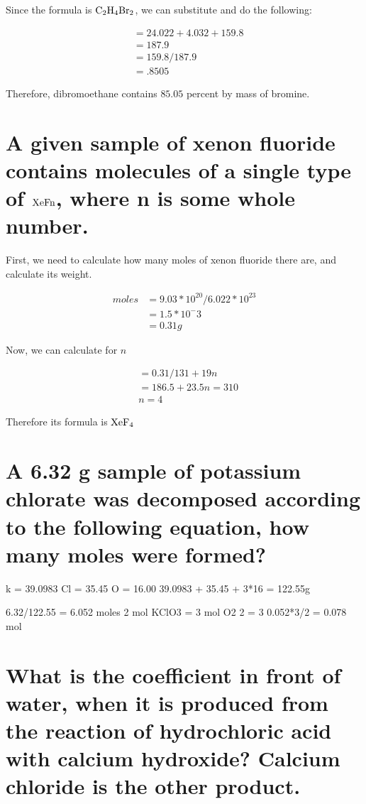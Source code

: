 \documentclass{scrartcl}
\begin{document}
Since the formula is  \(\ce{C2H4Br2}\), we can substitute and do the following:

\begin{align*}
&= 24.022 + 4.032 + 159.8\\
&= 187.9\\
&= 159.8/187.9\\
&=.8505
\end{align*}

Therefore, dibromoethane contains \(85.05\) percent by mass of bromine.

\section{A given sample of xenon fluoride contains molecules of a single type of \(\ce{XeFn}\), where n is some whole number.}
\label{sec:org71e1ffc}

First, we need to calculate how many moles of xenon fluoride there are, and
calculate its weight.

\begin{align*}
moles&=9.03*10^{20}/6.022*10^{23}\\
&= 1.5*10^-3\\
&= 0.31g
\end{align*}

Now, we can calculate for \(n\)

\begin{align*}
&= 0.31/131+19n\\
&= 186.5 + 23.5n = 310\\
&n = 4
\end{align*}

Therefore its formula is \(\ce{XeF4}\)

\section{A 6.32 g sample of potassium chlorate was decomposed according to the following equation, how many moles were formed?}
\label{sec:org077c84d}

k = 39.0983
Cl = 35.45
O = 16.00
39.0983 + 35.45 + 3*16 = 122.55g

6.32/122.55 = 6.052 moles
2 mol KClO3 = 3 mol O2
2 = 3
0.052*3/2
= 0.078 mol

\section{What is the coefficient in front of water, when it is produced from the reaction of hydrochloric acid with calcium hydroxide? Calcium chloride is the other product.}
\label{sec:orga4b52ab}
\end{document}
